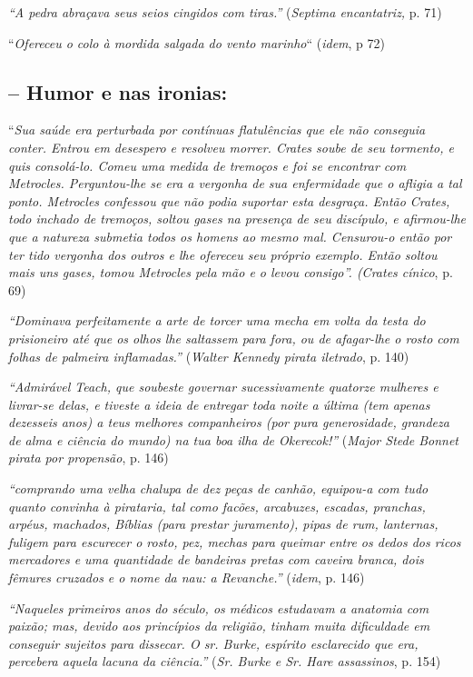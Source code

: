\documentclass[12pt]{extarticle}
\begin{document}
\emph{``A pedra abraçava seus seios cingidos com tiras.''}
(\emph{Septima encantatriz,} p. 71)

``\emph{Ofereceu o colo à mordida salgada do vento marinho}``
(\emph{idem}, p 72)

\subsection{-- Humor e nas ironias:}

``\emph{Sua saúde era perturbada por contínuas flatulências que ele não
conseguia conter. Entrou em desespero e resolveu morrer. Crates soube de
seu tormento, e quis consolá-lo. Comeu uma medida de tremoços e foi se
encontrar com Metrocles. Perguntou-lhe se era a vergonha de sua
enfermidade que o afligia a tal ponto. Metrocles confessou que não podia
suportar esta desgraça. Então Crates, todo inchado de tremoços, soltou
gases na presença de seu discípulo, e afirmou-lhe que a natureza
submetia todos os homens ao mesmo mal. Censurou-o então por ter tido
vergonha dos outros e lhe ofereceu seu próprio exemplo. Então soltou
mais uns gases, tomou Metrocles pela mão e o levou consigo''. (Crates
cínico}, p. 69)

\emph{``Dominava perfeitamente a arte de torcer uma mecha em volta da
testa do prisioneiro até que os olhos lhe saltassem para fora, ou de
afagar-lhe o rosto com folhas de palmeira inflamadas.''} (\emph{Walter
Kennedy pirata iletrado}, p. 140)

\emph{``Admirável Teach, que soubeste governar sucessivamente quatorze
mulheres e livrar-se delas, e tiveste a ideia de entregar toda noite a
última (tem apenas dezesseis anos) a teus melhores companheiros (por
pura generosidade, grandeza de alma e ciência do mundo) na tua boa ilha
de Okerecok!''} (\emph{Major Stede Bonnet pirata por propensão}, p. 146)

\emph{``comprando uma velha chalupa de dez peças de canhão, equipou-a
com tudo quanto convinha à pirataria, tal como facões, arcabuzes,
escadas, pranchas, arpéus, machados, Bíblias (para prestar juramento),
pipas de rum, lanternas, fuligem para escurecer o rosto, pez, mechas
para queimar entre os dedos dos ricos mercadores e uma quantidade de
bandeiras pretas com caveira branca, dois fêmures cruzados e o nome da
nau: a Revanche.''} (\emph{idem}, p. 146)

\emph{``Naqueles primeiros anos do século, os médicos estudavam a
anatomia com paixão; mas, devido aos princípios da religião, tinham
muita dificuldade em conseguir sujeitos para dissecar. O sr. Burke,
espírito esclarecido que era, percebera aquela lacuna da ciência.''}
(\emph{Sr. Burke e Sr. Hare assassinos}, p. 154)
\end{document}
